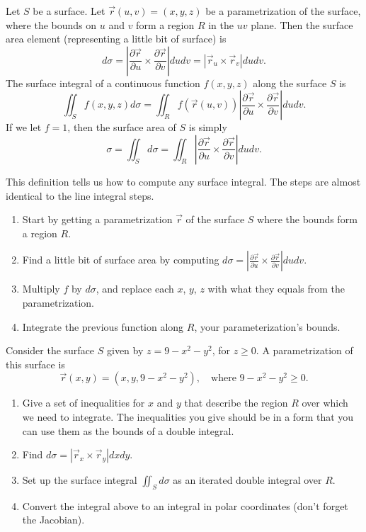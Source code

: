 \begin{definition}
 Let $S$ be a surface.  Let $\vec r(u,v)=(x,y,z)$ be a parametrization of the surface, where the bounds on $u$ and $v$ form a region $R$ in the $uv$ plane.  Then the surface area element (representing a little bit of surface) is 
$$d\sigma =\left |\frac{\partial \vec r}{\partial u} \times \frac{\partial \vec r}{\partial v}\right| dudv = \left|\vec r_u\times\vec r_v\right|dudv.$$
The surface integral of a continuous function $f(x,y,z)$ along the surface $S$ is 
$$\iint_S f(x,y,z) d\sigma = \iint_R f(\vec r(u,v)) \left |\frac{\partial \vec r}{\partial u} \times \frac{\partial \vec r}{\partial v}\right| dudv.$$
If we let $f=1$, then the surface area of $S$ is simply
$$\sigma = \iint_S d\sigma = \iint_R \left |\frac{\partial \vec r}{\partial u} \times \frac{\partial \vec r}{\partial v}\right| dudv.$$
\end{definition}

This definition tells us how to compute any surface integral. The steps are almost identical to the line integral steps.
\begin{enumerate}
 \item Start by getting a parametrization $\vec r$ of the surface $S$ where the bounds form a region $R$. 
 \item Find a little bit of surface area by computing $d\sigma =\left |\frac{\partial \vec r}{\partial u} \times \frac{\partial \vec r}{\partial v}\right| dudv.$
 \item Multiply $f$ by $d\sigma$, and replace each $x$, $y$, $z$ with what they equals from the parametrization.
 \item Integrate the previous function along $R$, your parameterization's bounds.
\end{enumerate}

\begin{problem}
 Consider the surface $S$ given by $z=9-x^2-y^2$, for $z\geq 0$. A parametrization of this surface is $$\vec r(x,y) = (x,y,9-x^2-y^2),\quad \text{where } 9-x^2-y^2\geq 0.$$ 
\begin{enumerate}
 \item Give a set of inequalities for $x$ and $y$ that describe the region $R$ over which we need to integrate. The inequalities you give should be in a form that you can use them as the bounds of a double integral.
 \item Find $d\sigma = \left|\vec r_x\times \vec r_y\right|dxdy$.
 \item Set up the surface integral $\iint_S d\sigma$ as an iterated double integral over $R$. 
 \item Convert the integral above to an integral in polar coordinates (don't forget the Jacobian).
\end{enumerate}
\end{problem}



